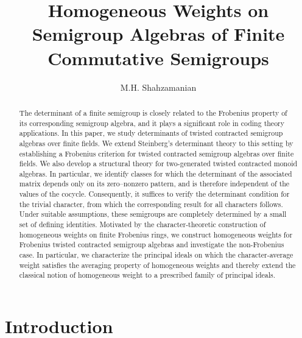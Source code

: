 \documentclass[11pt,reqno]{amsart}
\theoremstyle{plain}
\theoremstyle{remark}
\theoremstyle{definition}
\begin{document}
\title[Homogeneous Weights on Finite Semigroup Algebras]{Homogeneous Weights on Semigroup Algebras of Finite Commutative Semigroups}
\author{M.H. Shahzamanian}
\address{M.H. Shahzamanian\\ Centro de Matem\'atica e Departamento de Matem\'atica, Faculdade de Ci\^{e}ncias,
Universidade do Porto, Rua do Campo Alegre, 687, 4169-007 Porto, Portugal}

\begin{abstract}
The determinant of a finite semigroup is closely related to the Frobenius property of its corresponding  semigroup algebra, and it plays a significant role in coding theory applications. 
In this paper, we study determinants of twisted contracted semigroup algebras over finite fields. 
We extend Steinberg's determinant theory to this setting by establishing a Frobenius criterion for twisted contracted semigroup algebras over finite fields. 
We also develop a structural theory for two-generated twisted contracted monoid algebras. 
In particular, we identify classes for which the determinant of the associated matrix depends only on its zero--nonzero pattern, and is therefore independent of the values of the cocycle. 
Consequently, it suffices to verify the determinant condition for the trivial character, from which the corresponding result for all characters follows. 
Under suitable assumptions, these semigroups are completely determined by a small set of defining identities. 
Motivated by the character-theoretic construction of homogeneous weights on finite Frobenius rings, we construct homogeneous weights for Frobenius twisted contracted semigroup algebras and investigate the non-Frobenius case.
In particular, we characterize the principal ideals on which the character-average weight satisfies the averaging property of homogeneous weights and thereby extend the classical notion of homogeneous weight to a prescribed family of principal ideals.
\end{abstract}

\maketitle

\section{Introduction}
\end{document}
